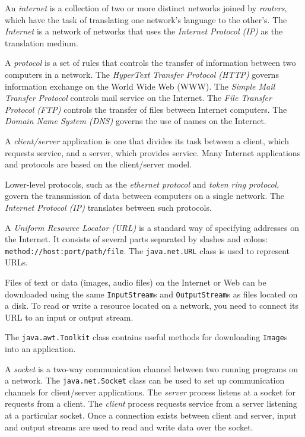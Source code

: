 \label{summaryof-important-points}
\begin{SMBL}
\item  An {\it internet} is a collection of two or more distinct networks
joined by {\it routers}, which have the task of translating one
network's language to the other's.  The {\it Internet} is a network of networks
that uses the {\it Internet Protocol (IP)} as the translation medium.

\item  A {\it protocol} is a set of rules that controls the transfer
of information between two computers in a network.  The {\it HyperText
Transfer Protocol (HTTP)} governs information exchange on the World
Wide Web (WWW). The {\it Simple Mail Transfer Protocol} controls mail
service on the Internet.  The {\it File Transfer Protocol (FTP)}
controls the transfer of files between Internet computers.  The {\it
Domain Name System (DNS)} governs the use of names on the Internet.

\item  A {\it client/server} application is one that divides
its task between a client, which requests service, and a
server, which provides service.  Many Internet applications
and protocols are based on the client/server model.

\item  Lower-level protocols, such as the {\it ethernet protocol}
and {\it token ring protocol}, govern the transmission of data between
computers on a single network.  The {\it Internet Protocol (IP)}
translates between such protocols.

\item   A {\it Uniform Resource Locator (URL)} is a standard way of
specifying addresses on the Internet.  It consists of several parts
separated by slashes and colons: {\tt method://host:port/path/file}.
The {\tt java.net.URL} class is used to represent URLs.

\item  Files of text or data (images, audio files) on the Internet
or Web can be downloaded using the same {\tt InputStream}s and
{\tt OutputStream}s as files located on a disk.  To read or write
a resource located on a network, you need to connect its URL to
an input or output stream.

\item  The {\tt java.awt.Toolkit} class contains useful methods
for downloading {\tt Image}s into an application.

\item  A {\it socket} is a two-way communication channel between
two running programs on a network.  The {\tt java.net.Socket}
class can be used to set up communication channels for
client/server applications.  The {\it server} process
listens at a socket for requests from a client.  The {\it client}
process requests service from a server listening at a particular
socket.  Once a connection exists between client and server,
input and output streams are used to read and write data over
the socket.
\end{SMBL}

